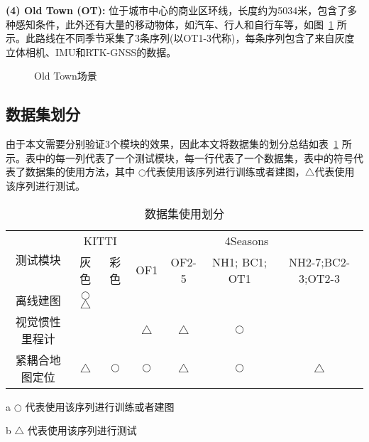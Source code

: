 \textbf{(4) Old Town (OT):} 位于城市中心的商业区环线，长度约为5034米，包含了多种感知条件，此外还有大量的移动物体，如汽车、行人和自行车等，如图~\ref{fig:OT_data} 所示。此路线在不同季节采集了3条序列(以OT1-3代称)，每条序列包含了来自灰度立体相机、IMU和RTK-GNSS的数据。

\begin{figure}
  \centering
  \caption{Old Town场景}
  \label{fig:OT_data}
\end{figure}

\subsection{数据集划分}

由于本文需要分别验证3个模块的效果，因此本文将数据集的划分总结如表~\ref{tab:dataset_usage} 所示。表中的每一列代表了一个测试模块，每一行代表了一个数据集，表中的符号代表了数据集的使用方法，其中{\color[HTML]{3166FF} $\bigcirc$}代表使用该序列进行训练或者建图，{\color[HTML]{FD6864}$\bigtriangleup$}代表使用该序列进行测试。

\begin{table}
\centering
\begin{threeparttable}
\caption{数据集使用划分}
\begin{tabular}{c|cc|cccc}
\toprule
\multirow{2}{*}{测试模块} & \multicolumn{2}{c|}{KITTI}               & \multicolumn{4}{c}{4Seasons}                                            \\ \cline{2-7} 
                  & 灰色                          & 彩色         & OF1              & OF2-5            & NH1; BC1; OT1 & NH2-7;BC2-3;OT2-3 \\ \midrule
离线建图 & {\color[HTML]{3166FF} $\bigcirc$}{\color[HTML]{FD6864}$\bigtriangleup$} &            &                  &                  &               &                   \\
视觉惯性里程计           &                             &            & {\color[HTML]{FD6864}$\bigtriangleup$} & {\color[HTML]{FD6864}$\bigtriangleup$} & {\color[HTML]{3166FF} $\bigcirc$}    &                   \\
紧耦合地图定位           & {\color[HTML]{FD6864}$\bigtriangleup$}           & {\color[HTML]{3166FF} $\bigcirc$} & {\color[HTML]{3166FF} $\bigcirc$}       & {\color[HTML]{FD6864}$\bigtriangleup$} & {\color[HTML]{3166FF} $\bigcirc$}    & {\color[HTML]{FD6864}$\bigtriangleup$}  \\ \bottomrule
\end{tabular}
\label{tab:dataset_usage}
\begin{tablenotes}
  \item [a] {\color[HTML]{3166FF} $\bigcirc$} 代表使用该序列进行训练或者建图
  \item [b] {\color[HTML]{FD6864}$\bigtriangleup$} 代表使用该序列进行测试
\end{tablenotes}
\end{threeparttable}
\end{table}

